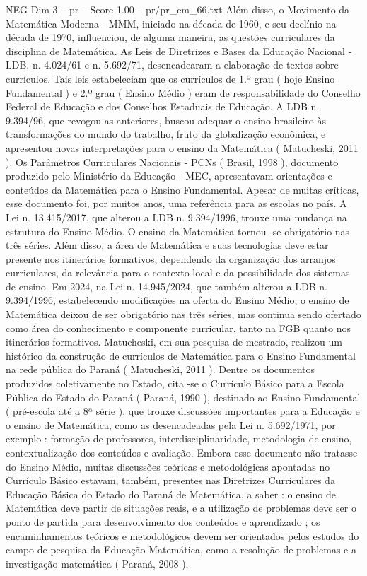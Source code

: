 \begin{textsample}{NEG Dim 3 – pr – Score 1.00 – pr/pr\_em\_66.txt}
Além disso, o Movimento da Matemática Moderna - MMM, iniciado na década de 1960, e seu declínio na década de 1970, influenciou, de alguma maneira, as questões curriculares da disciplina de Matemática.
As Leis de Diretrizes e Bases da Educação Nacional - LDB, n. 4.024/61 e n. 5.692/71, desencadearam a elaboração de textos sobre currículos.
Tais leis estabeleciam que os currículos de 1.º grau ( hoje Ensino Fundamental ) e 2.º grau ( Ensino Médio ) eram de responsabilidade do Conselho Federal de Educação e dos Conselhos Estaduais de Educação.
A LDB n. 9.394/96, que revogou as anteriores, buscou adequar o ensino brasileiro às transformações do mundo do trabalho, fruto da globalização econômica, e apresentou novas interpretações para o ensino da Matemática ( Matucheski, 2011 ).
Os Parâmetros Curriculares Nacionais - PCNs ( Brasil, 1998 ), documento produzido pelo Ministério da Educação - MEC, apresentavam orientações e conteúdos da Matemática para o Ensino Fundamental.
Apesar de muitas críticas, esse documento foi, por muitos anos, uma referência para as escolas no país.
A Lei n. 13.415/2017, que alterou a LDB n. 9.394/1996, trouxe uma mudança na estrutura do Ensino Médio.
O ensino da Matemática tornou -se obrigatório nas três séries.
Além disso, a área de Matemática e suas tecnologias deve estar presente nos itinerários formativos, dependendo da organização dos arranjos curriculares, da relevância para o contexto local e da possibilidade dos sistemas de ensino.
Em 2024, na Lei n. 14.945/2024, que também alterou a LDB n. 9.394/1996, estabelecendo modificações na oferta do Ensino Médio, o ensino de Matemática deixou de ser obrigatório nas três séries, mas continua sendo ofertado como área do conhecimento e componente curricular, tanto na FGB quanto nos itinerários formativos.
Matucheski, em sua pesquisa de mestrado, realizou um histórico da construção de currículos de Matemática para o Ensino Fundamental na rede pública do Paraná ( Matucheski, 2011 ).
Dentre os documentos produzidos coletivamente no Estado, cita -se o Currículo Básico para a Escola Pública do Estado do Paraná ( Paraná, 1990 ), destinado ao Ensino Fundamental ( pré-escola até a 8ª série ), que trouxe discussões importantes para a Educação e o ensino de Matemática, como as desencadeadas pela Lei n. 5.692/1971, por exemplo : formação de professores, interdisciplinaridade, metodologia de ensino, contextualização dos conteúdos e avaliação.
Embora esse documento não tratasse do Ensino Médio, muitas discussões teóricas e metodológicas apontadas no Currículo Básico estavam, também, presentes nas Diretrizes Curriculares da Educação Básica do Estado do Paraná de Matemática, a saber : o ensino de Matemática deve partir de situações reais, e a utilização de problemas deve ser o ponto de partida para desenvolvimento dos conteúdos e aprendizado ; os encaminhamentos teóricos e metodológicos devem ser orientados pelos estudos do campo de pesquisa da Educação Matemática, como a resolução de problemas e a investigação matemática ( Paraná, 2008 ).

\end{textsample}
